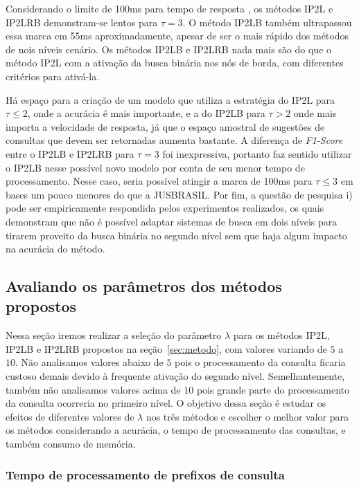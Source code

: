 Considerando o limite de 100ms para tempo de resposta \citep{ji2009efficient}, os métodos IP2L e IP2LRB demonstram-se lentos para $\tau=3$. O método IP2LB também ultrapassou essa marca em 55ms aproximadamente, apesar de ser o mais rápido dos métodos de nois níveis cenário. Os métodos IP2LB e IP2LRB nada mais são do que o método IP2L com a ativação da busca binária nos nós de borda, com diferentes critérios para ativá-la. 

Há espaço para a criação de um modelo que utiliza a estratégia do IP2L para $\tau \leq 2$, onde a acurácia é mais importante, e a do IP2LB para $\tau > 2$ onde mais importa a velocidade de resposta, já que o espaço amostral de sugestões de consultas que devem ser retornadas aumenta bastante. A diferença de \textit{F1-Score} entre o IP2LB e IP2LRB para $\tau=3$ foi inexpressiva, portanto faz sentido utilizar o IP2LB nesse possível novo modelo por conta de seu menor tempo de processamento. Nesse caso, seria possível atingir a marca de 100ms para $\tau \leq 3$ em bases um pouco menores do que a JUSBRASIL. Por fim, a questão de pesquisa i) pode ser empiricamente respondida pelos experimentos realizados, os quais demonstram que não é possível adaptar sistemas de busca em dois níveis para tirarem proveito da busca binária no segundo nível sem que haja algum impacto na acurácia do método.

\subsection{Avaliando os parâmetros dos métodos propostos}

Nessa seção iremos realizar a seleção do parâmetro $\lambda$ para os métodos IP2L, IP2LB e IP2LRB propostos na seção~\ref{sec:metodo}, com valores variando de $5$ a $10$. Não analisamos valores abaixo de $5$ pois o processamento da consulta ficaria custoso demais devido à frequente ativação do segundo nível. Semelhantemente, também não analisamos valores acima de $10$ pois grande parte do processamento da consulta ocorreria no primeiro nível. O objetivo dessa seção é estudar os efeitos de diferentes valores de $\lambda$ nos três métodos e escolher o melhor valor para os métodos considerando a acurácia, o tempo de processamento das consultas, e também consumo de memória.


\subsubsection{Tempo de processamento de prefixos de consulta}
\label{sec:methods-processing-time}

